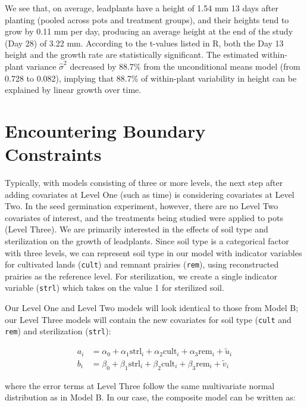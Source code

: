 \documentclass[
]{krantz}
\begin{document}
We see that, on average, leadplants have a height of 1.54 mm 13 days after planting (pooled across pots and treatment groups), and their heights tend to grow by 0.11 mm per day, producing an average height at the end of the study (Day 28) of 3.22 mm. According to the t-values listed in R, both the Day 13 height and the growth rate are statistically significant. The estimated within-plant variance \(\hat{\sigma}^2\) decreased by 88.7\% from the unconditional means model (from 0.728 to 0.082), implying that 88.7\% of within-plant variability in height can be explained by linear growth over time.

\hypertarget{sec:boundary}{%
\section{Encountering Boundary Constraints}\label{sec:boundary}}

Typically, with models consisting of three or more levels, the next step after adding covariates at Level One (such as time) is considering covariates at Level Two. In the seed germination experiment, however, there are no Level Two covariates of interest, and the treatments being studied were applied to pots (Level Three). We are primarily interested in the effects of soil type and sterilization on the growth of leadplants. Since soil type is a categorical factor with three levels, we can represent soil type in our model with indicator variables for cultivated lands (\texttt{cult}) and remnant prairies (\texttt{rem}), using reconstructed prairies as the reference level. For sterilization, we create a single indicator variable (\texttt{strl}) which takes on the value 1 for sterilized soil.

Our Level One and Level Two models will look identical to those from Model B; our Level Three models will contain the new covariates for soil type (\texttt{cult} and \texttt{rem}) and sterilization (\texttt{strl}):

\begin{align*}
a_{i} & = \alpha_{0}+\alpha_{1}\textrm{strl}_{i}+\alpha_{2}\textrm{cult}_{i}+\alpha_{3}\textrm{rem}_{i}+\tilde{u}_{i} \\
b_{i} & = \beta_{0}+\beta_{1}\textrm{strl}_{i}+\beta_{2}\textrm{cult}_{i}+\beta_{3}\textrm{rem}_{i}+\tilde{v}_{i}
\end{align*}

where the error terms at Level Three follow the same multivariate normal distribution as in Model B. In our case, the composite model can be written as:
\end{document}
